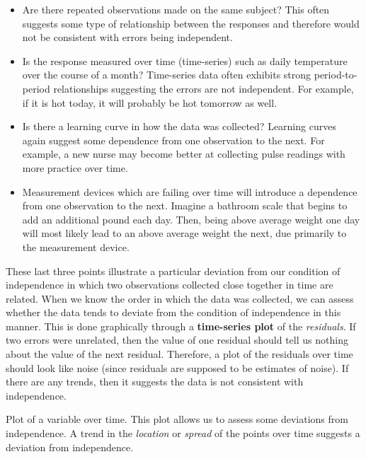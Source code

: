 \documentclass[]{book}
\providecommand{\tightlist}{%
  \setlength{\itemsep}{0pt}\setlength{\parskip}{0pt}}
\theoremstyle{plain}
\theoremstyle{mydefn}
\theoremstyle{myexmpl}
\theoremstyle{remark}
\let\BeginKnitrBlock\begin \let\EndKnitrBlock\end
\let\BeginKnitrBlock\begin \let\EndKnitrBlock\end
\begin{document}
\begin{itemize}
\tightlist
\item
  Are there repeated observations made on the same subject? This often
  suggests some type of relationship between the responses and therefore
  would not be consistent with errors being independent.
\item
  Is the response measured over time (time-series) such as daily
  temperature over the course of a month? Time-series data often
  exhibits strong period-to-period relationships suggesting the errors
  are not independent. For example, if it is hot today, it will probably
  be hot tomorrow as well.
\item
  Is there a learning curve in how the data was collected? Learning
  curves again suggest some dependence from one observation to the next.
  For example, a new nurse may become better at collecting pulse
  readings with more practice over time.
\item
  Measurement devices which are failing over time will introduce a
  dependence from one observation to the next. Imagine a bathroom scale
  that begins to add an additional pound each day. Then, being above
  average weight one day will most likely lead to an above average
  weight the next, due primarily to the measurement device.
\end{itemize}

These last three points illustrate a particular deviation from our
condition of independence in which two observations collected close
together in time are related. When we know the order in which the data
was collected, we can assess whether the data tends to deviate from the
condition of independence in this manner. This is done graphically
through a \textbf{time-series plot} of the \emph{residuals}. If two
errors were unrelated, then the value of one residual should tell us
nothing about the value of the next residual. Therefore, a plot of the
residuals over time should look like noise (since residuals are supposed
to be estimates of noise). If there are any trends, then it suggests the
data is not consistent with independence.

\BeginKnitrBlock{definition}[Time Series Plot]
\protect\hypertarget{def:defn-time-series-plot}{}{\label{def:defn-time-series-plot}
{} }Plot of a variable over time. This
plot allows us to assess some deviations from independence. A trend in
the \emph{location} or \emph{spread} of the points over time suggests a
deviation from independence.
\EndKnitrBlock{definition}
\end{document}
